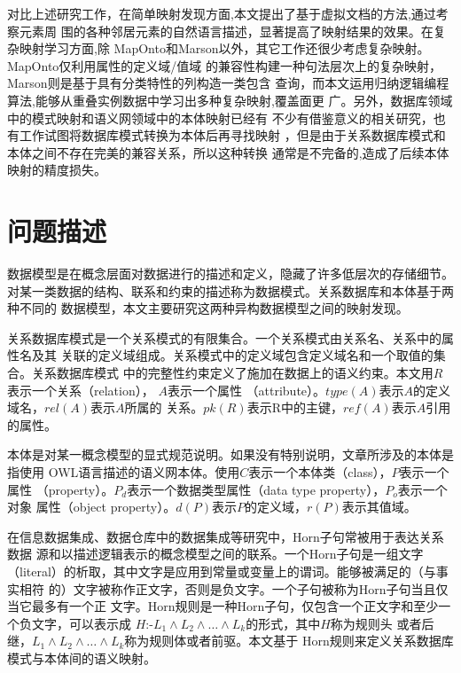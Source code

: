 对比上述研究工作，在简单映射发现方面,本文提出了基于虚拟文档的方法,通过考察元素周
围的各种邻居元素的自然语言描述，显著提高了映射结果的效果。在复杂映射学习方面,除
MapOnto和Marson以外，其它工作还很少考虑复杂映射。MapOnto仅利用属性的定义域/值域
的兼容性构建一种句法层次上的复杂映射，Marson则是基于具有分类特性的列构造一类包含
查询，而本文运用归纳逻辑编程算法,能够从重叠实例数据中学习出多种复杂映射,覆盖面更
广。另外，数据库领域中的模式映射\cite{30}和语义网领域中的本体映射\cite{31}已经有
不少有借鉴意义的相关研究，也有工作试图将数据库模式转换为本体后再寻找映射
\cite{28,29}，但是由于关系数据库模式和本体之间不存在完美的兼容关系，所以这种转换
通常是不完备的,造成了后续本体映射的精度损失。


\section{问题描述}

数据模型是在概念层面对数据进行的描述和定义，隐藏了许多低层次的存储细节\cite{9}。
对某一类数据的结构、联系和约束的描述称为数据模式。关系数据库和本体基于两种不同的
数据模型，本文主要研究这两种异构数据模型之间的映射发现。

关系数据库模式是一个关系模式的有限集合。一个关系模式由关系名、关系中的属性名及其
关联的定义域组成。关系模式中的定义域包含定义域名和一个取值的集合。关系数据库模式
中的完整性约束定义了施加在数据上的语义约束。本文用$R$表示一个关系（relation），
$A$表示一个属性 （attribute）。$type(A)$表示$A$的定义域名，$rel(A)$表示$A$所属的
关系。$pk(R)$表示R中的主键，$ref(A)$表示$A$引用的属性。


本体是对某一概念模型的显式规范说明。如果没有特别说明，文章所涉及的本体是指使用
OWL语言\cite{6}描述的语义网本体。使用$C$表示一个本体类（class），$P$表示一个属性
（property）。$P_d$表示一个数据类型属性（data type property），$P_o$表示一个对象
属性（object property）。$d(P)$表示$P$的定义域，$r(P)$表示其值域。

在信息数据集成、数据仓库中的数据集成等研究中，Horn子句常被用于表达关系数据
源和以描述逻辑表示的概念模型之间的联系\cite{10}。一个Horn子句是一组文字
（literal）的析取，其中文字是应用到常量或变量上的谓词。能够被满足的（与事实相符
的）文字被称作正文字，否则是负文字。一个子句被称为Horn子句当且仅当它最多有一个正
文字。Horn规则是一种Horn子句，仅包含一个正文字和至少一个负文字，可以表示成
$H \mbox{:-} L_1 \wedge L_2 \wedge \ldots \wedge L_k $的形式，其中$H$称为规则头
或者后继，$L_1 \wedge L_2 \wedge \ldots \wedge L_k$称为规则体或者前驱。本文基于
Horn规则来定义关系数据库模式与本体间的语义映射。

